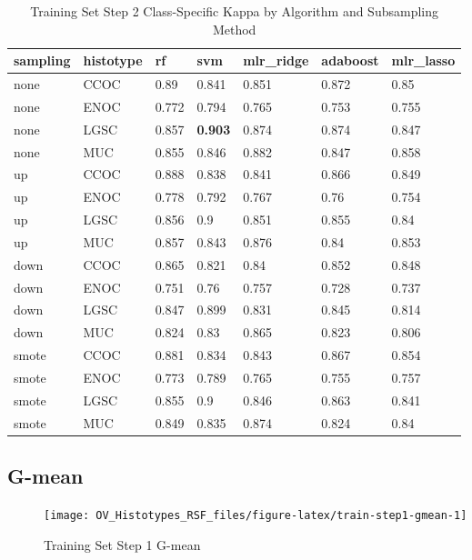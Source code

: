 \documentclass[
]{report}
\begin{document}
\begin{table}

\caption{\label{tab:train-step2-kappa-class-table}Training Set Step 2 Class-Specific Kappa by Algorithm and Subsampling Method}
\centering
\begin{tabular}[t]{l|l|l|l|l|l|l}
\hline
sampling & histotype & rf & svm & mlr\_ridge & adaboost & mlr\_lasso\\
\hline
none & CCOC & 0.89 & 0.841 & 0.851 & 0.872 & 0.85\\
\hline
none & ENOC & 0.772 & 0.794 & 0.765 & 0.753 & 0.755\\
\hline
none & LGSC & 0.857 & \textbf{0.903} & 0.874 & 0.874 & 0.847\\
\hline
none & MUC & 0.855 & 0.846 & 0.882 & 0.847 & 0.858\\
\hline
up & CCOC & 0.888 & 0.838 & 0.841 & 0.866 & 0.849\\
\hline
up & ENOC & 0.778 & 0.792 & 0.767 & 0.76 & 0.754\\
\hline
up & LGSC & 0.856 & 0.9 & 0.851 & 0.855 & 0.84\\
\hline
up & MUC & 0.857 & 0.843 & 0.876 & 0.84 & 0.853\\
\hline
down & CCOC & 0.865 & 0.821 & 0.84 & 0.852 & 0.848\\
\hline
down & ENOC & 0.751 & 0.76 & 0.757 & 0.728 & 0.737\\
\hline
down & LGSC & 0.847 & 0.899 & 0.831 & 0.845 & 0.814\\
\hline
down & MUC & 0.824 & 0.83 & 0.865 & 0.823 & 0.806\\
\hline
smote & CCOC & 0.881 & 0.834 & 0.843 & 0.867 & 0.854\\
\hline
smote & ENOC & 0.773 & 0.789 & 0.765 & 0.755 & 0.757\\
\hline
smote & LGSC & 0.855 & 0.9 & 0.846 & 0.863 & 0.841\\
\hline
smote & MUC & 0.849 & 0.835 & 0.874 & 0.824 & 0.84\\
\hline
\end{tabular}
\end{table}

\hypertarget{g-mean-1}{%
\subsection{G-mean}\label{g-mean-1}}

\begin{figure}[H]

{\centering \texttt{[image: OV\_Histotypes\_RSF\_files/figure-latex/train-step1-gmean-1]} 

}

\caption{Training Set Step 1 G-mean}\label{fig:train-step1-gmean}
\end{figure}
\end{document}
